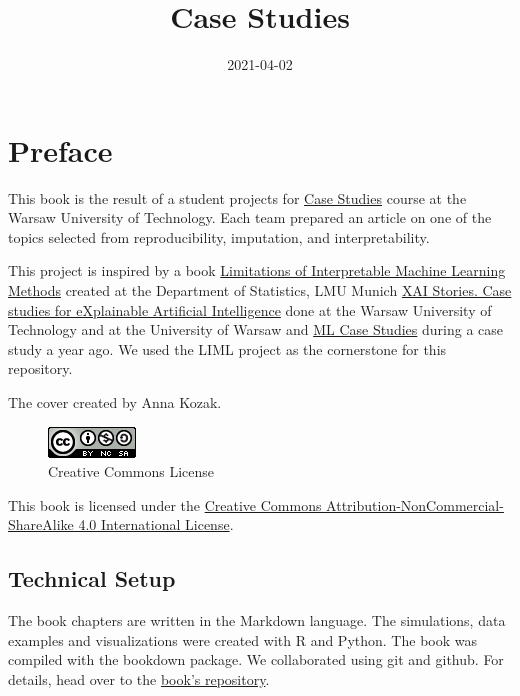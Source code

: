 \documentclass[
]{krantz}
\title{Case Studies}
\author{}
\date{\vspace{-2.5em}2021-04-02}
\begin{document}
\maketitle

{
\hypersetup{linkcolor=}
\setcounter{tocdepth}{2}
\tableofcontents
}
\hypertarget{preface}{%
\section*{Preface}\label{preface}}

This book is the result of a student projects for \href{https://github.com/mini-pw/2021L-WarsztatyBadawcze}{Case Studies} course at the Warsaw University of Technology. Each team prepared an article on one of the topics selected from reproducibility, imputation, and interpretability.

This project is inspired by a book \href{https://compstat-lmu.github.io/iml_methods_limitations/}{Limitations of Interpretable Machine Learning Methods} created at the Department of Statistics, LMU Munich \href{https://pbiecek.github.io/xai_stories/}{XAI Stories. Case studies for eXplainable Artificial Intelligence} done at the Warsaw University of Technology and at the University of Warsaw and \href{https://mini-pw.github.io/2020L-WB-Book/}{ML Case Studies} during a case study a year ago.
We used the LIML project as the cornerstone for this repository.

The cover created by Anna Kozak.

\begin{figure}
\centering
\includegraphics{images/by-nc-sa.png}
\caption{Creative Commons License}
\end{figure}

This book is licensed under the \href{http://creativecommons.org/licenses/by-nc-sa/4.0/}{Creative Commons Attribution-NonCommercial-ShareAlike 4.0 International License}.

\mainmatter

\hypertarget{technical-setup}{%
\subsection*{Technical Setup}\label{technical-setup}}

The book chapters are written in the Markdown language.
The simulations, data examples and visualizations were created with R \citep{rlang} and Python.
The book was compiled with the bookdown package.
We collaborated using git and github.
For details, head over to the \href{https://github.com/mini-pw/2021L-WB-Book}{book's repository}.
\end{document}
